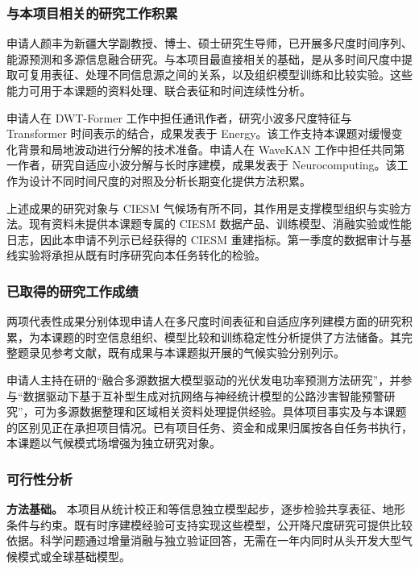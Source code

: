 \justifying
\NSFCBodyText

\subsubsection{与本项目相关的研究工作积累}

申请人颜丰为新疆大学副教授、博士、硕士研究生导师，已开展多尺度时间序列、能源预测和多源信息融合研究。与本项目最直接相关的基础，是从多时间尺度中提取可复用表征、处理不同信息源之间的关系，以及组织模型训练和比较实验。这些能力可用于本课题的资料处理、联合表征和时间连续性分析。

申请人在 DWT-Former 工作中担任通讯作者，研究小波多尺度特征与 Transformer 时间表示的结合，成果发表于 Energy\cite{DWT2025}。该工作支持本课题对缓慢变化背景和局地波动进行分解的技术准备。申请人在 WaveKAN 工作中担任共同第一作者，研究自适应小波分解与长时序建模，成果发表于 Neurocomputing\cite{WaveKAN2026}。该工作为设计不同时间尺度的对照及分析长期变化提供方法积累。

上述成果的研究对象与 CIESM 气候场有所不同，其作用是支撑模型组织与实验方法。现有资料未提供本课题专属的 CIESM 数据产品、训练模型、消融实验或性能日志，因此本申请不列示已经获得的 CIESM 重建指标。第一季度的数据审计与基线实验将承担从既有时序研究向本任务转化的检验。

\subsubsection{已取得的研究工作成绩}

两项代表性成果分别体现申请人在多尺度时间表征和自适应序列建模方面的研究积累，为本课题的时空信息组织、模型比较和训练稳定性分析提供了方法储备。其完整题录见参考文献，既有成果与本课题拟开展的气候实验分别列示。

申请人主持在研的“融合多源数据大模型驱动的光伏发电功率预测方法研究”，并参与“数据驱动下基于互补型生成对抗网络与神经统计模型的公路沙害智能预警研究”，可为多源数据整理和区域相关资料处理提供经验。具体项目事实及与本课题的区别见正在承担项目情况。已有项目任务、资金和成果归属按各自任务书执行，本课题以气候模式场增强为独立研究对象。

\subsubsection{可行性分析}

\textbf{方法基础。}
本项目从统计校正和等信息独立模型起步，逐步检验共享表征、地形条件与约束。既有时序建模经验可支持实现这些模型，公开降尺度研究可提供比较依据。科学问题通过增量消融与独立验证回答，无需在一年内同时从头开发大型气候模式或全球基础模型。

